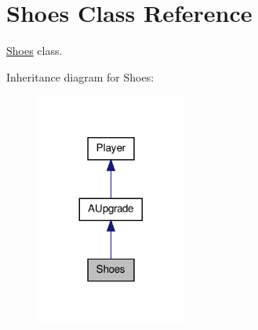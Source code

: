 \hypertarget{class_shoes}{\section{Shoes Class Reference}
\label{class_shoes}
}


\hyperlink{class_shoes}{Shoes} class.  




Inheritance diagram for Shoes\-:\nopagebreak
\begin{figure}[H]
\begin{center}
\leavevmode
\includegraphics[width=140pt]{class_shoes__inherit__graph}
\end{center}
\end{figure}
